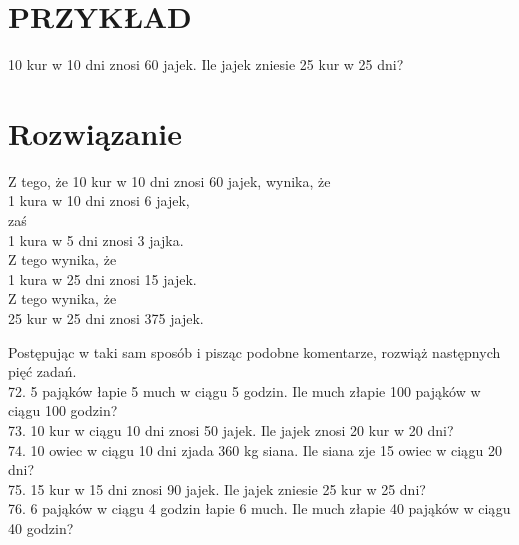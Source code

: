 \documentclass[10pt]{article}
\begin{document}
\section*{PRZYKŁAD}
10 kur w 10 dni znosi 60 jajek. Ile jajek zniesie 25 kur w 25 dni?

\section*{Rozwiązanie}
Z tego, że 10 kur w 10 dni znosi 60 jajek, wynika, że\\
1 kura w 10 dni znosi 6 jajek,\\
zaś\\
1 kura w 5 dni znosi 3 jajka.\\
Z tego wynika, że\\
1 kura w 25 dni znosi 15 jajek.\\
Z tego wynika, że\\
25 kur w 25 dni znosi 375 jajek.

Postępując w taki sam sposób i pisząc podobne komentarze, rozwiąż następnych pięć zadań.\\
72. 5 pająków łapie 5 much w ciągu 5 godzin. Ile much złapie 100 pająków w ciągu 100 godzin?\\
73. 10 kur w ciągu 10 dni znosi 50 jajek. Ile jajek znosi 20 kur w 20 dni?\\
74. 10 owiec w ciągu 10 dni zjada 360 kg siana. Ile siana zje 15 owiec w ciągu 20 dni?\\
75. 15 kur w 15 dni znosi 90 jajek. Ile jajek zniesie 25 kur w 25 dni?\\
76. 6 pająków w ciągu 4 godzin łapie 6 much. Ile much złapie 40 pająków w ciągu 40 godzin?
\end{document}
